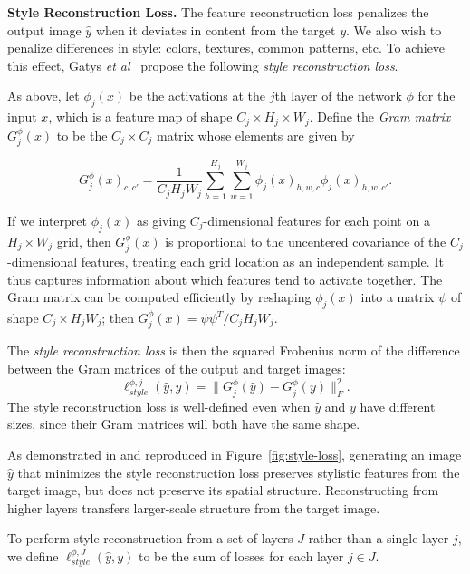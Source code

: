 \documentclass[runningheads]{llncs}
\newcommand{\etal}{\textit{et al}}
\begin{document}
\vspace{1mm}
\noindent\textbf{Style Reconstruction Loss.}
The feature reconstruction loss penalizes the output image $\hat y$ when it deviates in
content from the target $y$. We also wish to penalize differences in style:
colors, textures, common patterns, etc. To achieve this effect, Gatys
\etal~\cite{Gatys2015b,gatys2015neural} propose the following \emph{style reconstruction loss}.

As above, let $\phi_j(x)$ be the activations at the $j$th layer of the network $\phi$
for the input $x$, which is a feature map of shape
$C_j\times H_j\times W_j$. Define the \emph{Gram matrix} $G^\phi_j(x)$ to be the
$C_j\times C_j$ matrix whose elements are given by

\begin{equation}
  G^\phi_j(x)_{c, c'} = \frac1{C_jH_jW_j}\sum_{h=1}^{H_j}\sum_{w=1}^{W_j}\phi_j(x)_{h,w,c}\phi_j(x)_{h,w,c'}.
\end{equation}

If we interpret $\phi_j(x)$ as giving $C_j$-dimensional features for each point on a
$H_j\times W_j$ grid, then $G^\phi_j(x)$ is proportional to the uncentered covariance of the
$C_j$-dimensional features, treating each grid location as an independent sample.
It thus captures information about which features tend to activate together.
The Gram matrix can be computed efficiently by reshaping $\phi_j(x)$ into a matrix $\psi$ of
shape $C_j\times H_jW_j$; then $G^\phi_j(x) = \psi\psi^T/C_jH_jW_j$.

The \emph{style reconstruction loss} is then the squared Frobenius norm of the difference between
the Gram matrices of the output and target images:
\begin{equation}
  \ell_{style}^{\phi, j}(\hat y, y) = \|G^\phi_j(\hat y) - G^\phi_j(y)\|_F^2.
\end{equation}
The style reconstruction loss is well-defined even when $\hat y$ and $y$ have different
sizes, since their Gram matrices will both have the same shape.

As demonstrated in \cite{gatys2015neural} and reproduced in Figure~\ref{fig:style-loss},
generating an image $\hat y$ that minimizes the style reconstruction loss preserves stylistic
features from the target image, but does not preserve its spatial structure. Reconstructing
from higher layers transfers larger-scale structure from the target image.

To perform style reconstruction from a set of layers $J$ rather than a single layer $j$,
we define $\ell_{style}^{\phi, J}(\hat y, y)$ to be the sum of losses for each layer $j\in J$.
\end{document}
